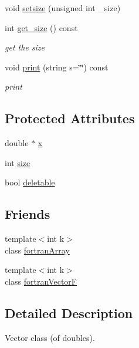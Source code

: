 \begin{DoxyCompactItemize}
\item 
void \hyperlink{classodes_1_1fortranVector_a7f11009e278203c327c93d68e86117c9}{setsize} (unsigned int \+\_\+size)
\item 
int \hyperlink{classodes_1_1fortranVector_a0a9a82f6efc0a9e5ea40dc240eebc800}{get\+\_\+size} () const 
\begin{DoxyCompactList}\small\item\em get the size \end{DoxyCompactList}\item 
void \hyperlink{classodes_1_1fortranVector_a135030af7550fd1e76324303e1fb25e3}{print} (string s=\char`\"{}\char`\"{}) const 
\begin{DoxyCompactList}\small\item\em print \end{DoxyCompactList}\end{DoxyCompactItemize}
\subsection*{Protected Attributes}
\begin{DoxyCompactItemize}
\item 
double $\ast$ \hyperlink{classodes_1_1fortranVector_aa92f26c38f887fca314d4e031b5ebe29}{x}
\item 
int \hyperlink{classodes_1_1fortranVector_a4734531bec0ccbaf24f22c12969580db}{size}
\item 
bool \hyperlink{classodes_1_1fortranVector_ace9b5d1e721b6f82ed090350181557b6}{deletable}
\end{DoxyCompactItemize}
\subsection*{Friends}
\begin{DoxyCompactItemize}
\item 
{\footnotesize template$<$int k$>$ }\\class \hyperlink{classodes_1_1fortranVector_a073cb7f07821b815ad65e098723e8a53}{fortran\+Array}
\item 
{\footnotesize template$<$int k$>$ }\\class \hyperlink{classodes_1_1fortranVector_a6f2443030a60ee3f140d4969edbd2914}{fortran\+Vector\+F}
\end{DoxyCompactItemize}


\subsection{Detailed Description}
Vector class (of doubles). 

